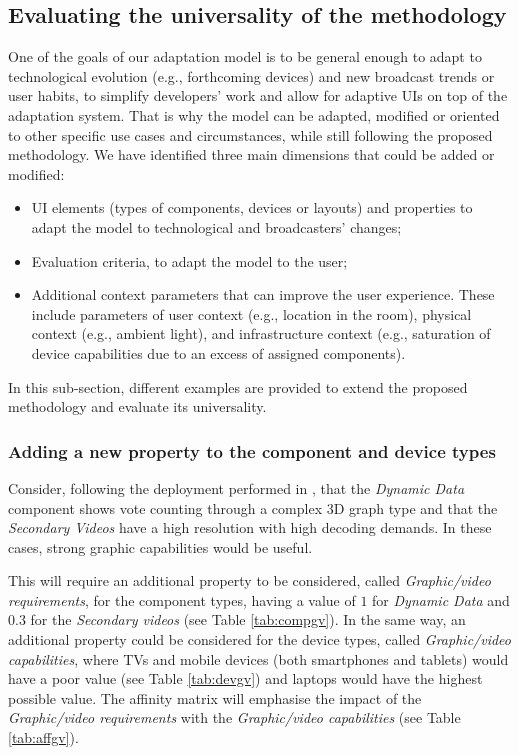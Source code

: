 \subsection{Evaluating the universality of the methodology}

One of the goals of our adaptation model is to be general enough to adapt to technological evolution (e.g., forthcoming devices) and new broadcast trends or user habits, to simplify developers' work and allow for adaptive UIs on top of the adaptation system. That is why the model can be adapted, modified or oriented to other specific use cases and circumstances, while still following the proposed methodology. 
We have identified three main dimensions that could be added or modified:
\begin{itemize}
	\item UI elements (types of components, devices or layouts) and properties to adapt the model to technological and broadcasters' changes;
	\item Evaluation criteria, to adapt the model to the user;
	\item Additional context parameters that can improve the user experience. These include parameters of user context (e.g., location in the room), physical context (e.g., ambient light), and infrastructure context (e.g., saturation of device capabilities due to an excess of assigned components).
\end{itemize}


In this sub-section, different examples are provided to extend the proposed methodology and evaluate its universality.

\subsubsection{Adding a new property to the component and device types}

Consider, following the deployment performed in \cite{dominguez2017deployment}, that the \textit{Dynamic Data} component shows vote counting through a complex 3D graph type and that the \textit{Secondary Videos} have a high resolution with high decoding demands. In these cases, strong graphic capabilities would be useful. 

This will require an additional property to be considered, called \textit{Graphic/video requirements}, for the component types, having a value of $1$ for \textit{Dynamic Data}  and $0.3$ for the \textit{Secondary videos} (see Table \ref{tab:compgv}). In the same way, an additional property could be considered for the device types, called \textit{Graphic/video capabilities}, where TVs and mobile devices (both smartphones and tablets) would have a poor value (see Table \ref{tab:devgv}) and laptops would have the highest possible value. The affinity matrix will emphasise the impact of the \textit{Graphic/video requirements} with the \textit{Graphic/video capabilities} (see Table \ref{tab:affgv}).


